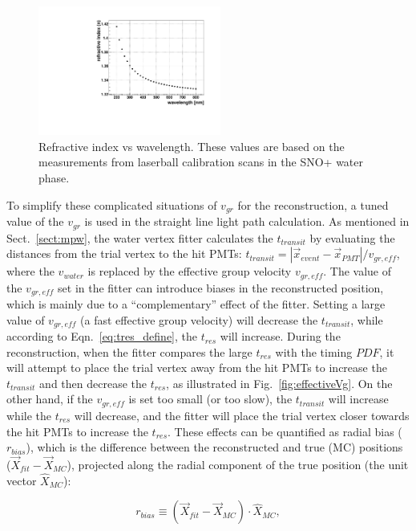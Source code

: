 \begin{figure}[!htb]
	\centering
	\includegraphics[width=6cm]{refractiveIndexVsWavelength.pdf}
	\caption[Refractive index vs wavelength.]{Refractive index vs wavelength. These values are based on the measurements from laserball calibration scans in the SNO+ water phase\cite{laserball_groupVelocity}.}
	\label{nVsWavelength}
\end{figure}

To simplify these complicated situations of $v_{gr}$ for the reconstruction, a tuned value of the $v_{gr}$ is used in the straight line light path calculation. As mentioned in Sect.~\ref{sect:mpw}, the water vertex fitter calculates the $t_{transit}$ by evaluating the distances from the trial vertex to the hit PMTs: $t_{transit}=|\vec{x}_{event}-\vec{x}_{PMT}|/v_{gr,eff}$, where the $v_{water}$ is replaced by the effective group velocity $v_{gr,eff}$. The value of the $v_{gr,eff}$ set in the fitter can introduce biases in the reconstructed position, which is mainly due to a ``complementary'' effect of the fitter. Setting a large value of $v_{gr,eff}$ (a fast effective group velocity) will decrease the $t_{transit}$, while according to Eqn.~\ref{eq:tres_define}, the $t_{res}$ will increase. During the reconstruction, when the fitter compares the large $t_{res}$ with the timing $PDF$, it will attempt to place the trial vertex away from the hit PMTs to increase the $t_{transit}$ and then decrease the $t_{res}$, as illustrated in Fig.~\ref{fig:effectiveVg}. On the other hand, if the $v_{gr,eff}$ is set too small (or too slow), the $t_{transit}$ will increase while the $t_{res}$ will decrease, and the fitter will place the trial vertex closer towards the hit PMTs to increase the $t_{res}$. These effects can be quantified as radial bias ($r_{bias}$), which is the difference between the reconstructed and true (MC) positions ($\vec{X}_{fit}-\vec{X}_{MC}$), projected along the radial component of the true position (the unit vector $\hat{X}_{MC}$)\cite{coulter2013modelling}:

\begin{equation}
r_{bias} \equiv (\vec{X}_{fit}-\vec{X}_{MC})\cdot \hat{X}_{MC},
\end{equation}

